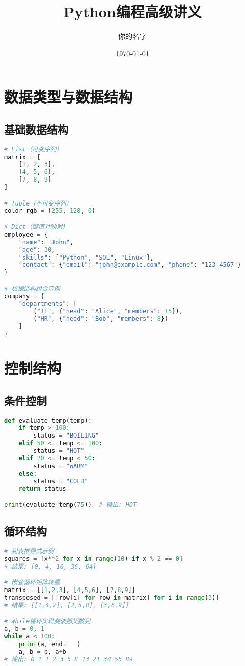 \documentclass{article}
\title{Python编程高级讲义}
\author{你的名字}
\date{\today}
\begin{document}
\maketitle

\section{数据类型与数据结构}
\subsection{基础数据结构}
\begin{lstlisting}[language=Python]
# List（可变序列）
matrix = [
    [1, 2, 3],
    [4, 5, 6],
    [7, 8, 9]
]

# Tuple（不可变序列）
color_rgb = (255, 128, 0)

# Dict（键值对映射）
employee = {
    "name": "John",
    "age": 30,
    "skills": ["Python", "SQL", "Linux"],
    "contact": {"email": "john@example.com", "phone": "123-4567"}
}

# 数据结构组合示例
company = {
    "departments": [
        ("IT", {"head": "Alice", "members": 15}),
        ("HR", {"head": "Bob", "members": 8})
    ]
}
\end{lstlisting}

\section{控制结构}
\subsection{条件控制}
\begin{lstlisting}[language=Python]
def evaluate_temp(temp):
    if temp > 100:
        status = "BOILING"
    elif 50 <= temp <= 100:
        status = "HOT"
    elif 20 <= temp < 50:
        status = "WARM"
    else:
        status = "COLD"
    return status

print(evaluate_temp(75))  # 输出: HOT
\end{lstlisting}

\subsection{循环结构}
\begin{lstlisting}[language=Python]
# 列表推导式示例
squares = [x**2 for x in range(10) if x % 2 == 0]
# 结果: [0, 4, 16, 36, 64]

# 嵌套循环矩阵转置
matrix = [[1,2,3], [4,5,6], [7,8,9]]
transposed = [[row[i] for row in matrix] for i in range(3)]
# 结果: [[1,4,7], [2,5,8], [3,6,9]]

# While循环实现斐波那契数列
a, b = 0, 1
while a < 100:
    print(a, end=' ')
    a, b = b, a+b
# 输出: 0 1 1 2 3 5 8 13 21 34 55 89 
\end{lstlisting}
\end{document}
